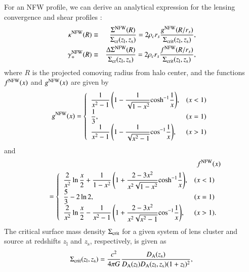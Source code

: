 \documentclass[iop, apj]{emulateapj}
\newcommand{\?}{\stackrel{?}{=}}
\begin{document}
For an NFW profile, we can derive an analytical expression for the
lensing convergence and shear profiles
\citep{Bartelmann:96,GolseKneib:02}:
%
\begin{eqnarray}
 \kappa^{\rm NFW}(R)&\equiv & \frac{\Sigma^{\rm NFW}(R)}{\Sigma_{\rm
  cr}(z_\mathrm{l},z_\mathrm{s})}=2\rho_cr_s\frac{g^{\rm NFW}(R/r_s)}{\Sigma_{\rm crit}(z_\mathrm{l},z_\mathrm{s})},\nonumber\\
\gamma^{\rm NFW}_+(R)&\equiv & \frac{\Delta\Sigma^{\rm NFW}(R)}{\Sigma_{\rm
  cr}(z_\mathrm{l},z_\mathrm{s})}=2\rho_cr_s\frac{f^{\rm NFW}(R/r_s)}{\Sigma_{\rm
  crit}(z_\mathrm{l},z_\mathrm{s})},
\label{eq:nfw_lens}
\end{eqnarray}
%
where $R$ is the projected comoving radius from halo center, and the
functions $f^{\rm NFW}(x)$ and $g^{\rm NFW}(x)$ are given by
%
\begin{equation}
 g^{\rm NFW}(x)
  =\left\{
  \begin{array}{ll}
  {\displaystyle \frac{1}{x^2-1}\left(1-\frac{1}{\sqrt{1-x^2}}\mathrm{cosh}^{-1} \frac{1}{x}\right)}, & \text(x<1)\\
  {\displaystyle \frac{1}{3}}, & \text (x=1)\\
  {\displaystyle \frac{1}{x^2-1}\left(1-\frac{1}{\sqrt{x^2-1}}\mathrm{cos}^{-1} \frac{1}{x}\right)}, &\text (x>1)\\
  \end{array}
  \right.
 \end{equation}
 and
 \begin{eqnarray}
&& f^{\rm NFW}(x)\nonumber\\
&&  =\left\{
  \begin{array}{ll}
   {\displaystyle \frac{2}{x^2}\ln\frac{x}{2}+\frac{1}{1-x^2}
    \left(
1+\frac{2-3x^2}{x^2\sqrt{1-x^2}}\mathrm{cosh}^{-1}\frac{1}{x}
	     \right)},
    & \text(x<1)\\
   {\displaystyle \frac{5}{3}-2\ln2}, & \text (x=1)\\
      {\displaystyle \frac{2}{x^2}\ln\frac{x}{2}-\frac{1}{x^2-1}
    \left(
1+\frac{2-3x^2}{x^2\sqrt{x^2-1}}\mathrm{cos}^{-1}\frac{1}{x}
	     \right)},
 &\text (x>1).\\
  \end{array}
			 \right.
  \label{eq:fnfw}
 \end{eqnarray}
%
The critical surface mass density $\Sigma_{\rm crit}$ for a given system
of lens cluster and source at redshifts $z_{\mathrm{l}}$ and
$z_{\mathrm{s}}$, respectively, is given as
%
\begin{equation}
 \Sigma_{\rm crit}(z_\mathrm{l},z_\mathrm{s})
  = \frac{c^2}{4\pi
  G}\frac{D_\mathrm{A}(z_\mathrm{s})}{D_\mathrm{A}(z_\mathrm{l})D_\mathrm{A}(z_\mathrm{l},z_\mathrm{s})(1+z_{\rm
  l})^2},
\end{equation}
\end{document}

